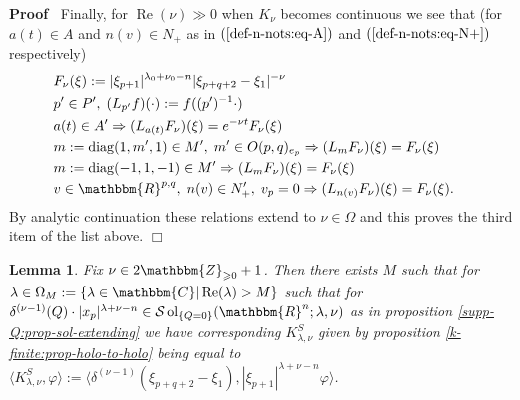\documentclass{article}
\newcommand{\assign}{:=}
\newcommand{\nocomma}{}
\newcommand{\tmop}[1]{\ensuremath{\operatorname{#1}}}
\newenvironment{proof}{\noindent\textbf{Proof\ }}{\hspace*{\fill}$\Box$\medskip}
\newtheorem{lemma}{Lemma}
\begin{document}
\begin{proof}
  Finally, for $\tmop{Re} (\nu) \gg 0$ when $K_{\nu}$ becomes continuous we
  see that (for $a (t) \in A$ and $n (v) \in N_+$ as in
  $(\ref{def-n-nots:eq-A})$ and $(\ref{def-n-nots:eq-N+})$ respectively)
  \begin{eqnarray}
    & F_{\nu} (\xi) : = | \xi_{p + 1} |^{\lambda_0 + \nu_0 - n} | \xi_{p + q
    + 2} - \xi_1 |^{- \nu} &  \nonumber\\
    & p' \in P', \; (L_{p'} f) (\cdot) \assign f ((p')^{- 1} \cdot) & 
    \nonumber\\
    & a (t) \in A' \Rightarrow (L_{a (t)} F_{\nu}) (\xi) = e^{- \nu t}
    F_{\nu} (\xi) &  \nonumber\\
    & m \assign \tmop{diag} (1, m', 1) \in M', \; m' \in O (p, q)_{e_p}
    \Rightarrow (L_m F_{\nu}) (\xi) = F_{\nu} (\xi) &  \nonumber\\
    & m \assign \tmop{diag} (- 1, 1, - 1) \in M' \Rightarrow (L_m F_{\nu})
    (\xi) = F_{\nu} (\xi) &  \nonumber\\
    & v \in \mathbbm{R}^{p, q}, \; n (v) \in N_+', \; v_p = 0 \Rightarrow
    (L_{n (v)} F_{\nu}) (\xi) = F_{\nu} (\xi) . &  \nonumber
  \end{eqnarray}
  By analytic continuation these relations extend to $\nu \in \Omega$ and this
  proves the third item of the list above.
\end{proof}

\begin{lemma}
  \label{k-finite:lem-c2}Fix $\nu \in 2\mathbbm{Z}_{\geqslant 0} + 1$. Then
  there exists $M$ such that for $\lambda \in \Omega_M \assign \{ \lambda \in
  \mathbbm{C} | \tmop{Re} (\lambda) > M \}$ such that for $\delta^{(\nu - 1)}
  (Q) \cdot | x_p |^{\lambda + \nu - n} \in \mathcal{S} \tmop{ol}_{\{ Q = 0
  \}} (\mathbbm{R}^n ; \lambda, \nu)$ as in proposition
  \ref{supp-Q:prop-sol-extending} we have corresponding $K^S_{\lambda, \nu}$
  given by proposition \ref{k-finite:prop-holo-to-holo} being equal to
  $\langle K_{\lambda, \nu}^S, \varphi \rangle \assign \langle \delta^{(\nu -
  1)} (\xi_{p + q + 2} - \xi_1) \nocomma, | \xi_{p + 1} |^{\lambda + \nu - n}
  \varphi \nocomma \rangle$.
\end{lemma}
\end{document}

